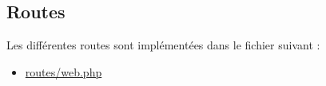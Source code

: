 \subsection{Routes}

Les différentes routes sont implémentées dans le fichier suivant :

\begin{itemize}[label=$\bullet$]
	\item \url{routes/web.php}
\end{itemize}